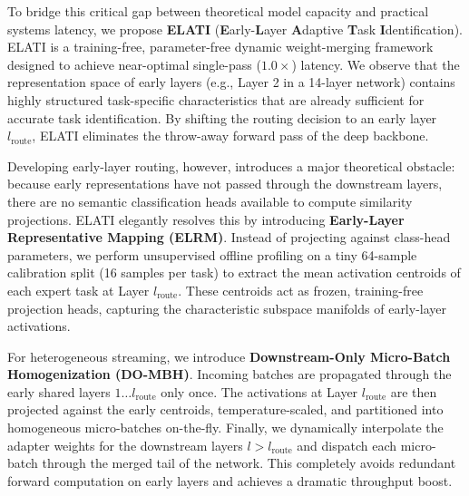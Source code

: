 To bridge this critical gap between theoretical model capacity and practical systems latency, we propose \textbf{ELATI} (\textbf{E}arly-\textbf{L}ayer \textbf{A}daptive \textbf{T}ask \textbf{I}dentification).
ELATI is a training-free, parameter-free dynamic weight-merging framework designed to achieve near-optimal single-pass ($1.0\times$) latency.
We observe that the representation space of early layers (e.g., Layer 2 in a 14-layer network) contains highly structured task-specific characteristics that are already sufficient for accurate task identification.
By shifting the routing decision to an early layer $l_{\text{route}}$, ELATI eliminates the throw-away forward pass of the deep backbone.

Developing early-layer routing, however, introduces a major theoretical obstacle: because early representations have not passed through the downstream layers, there are no semantic classification heads available to compute similarity projections.
ELATI elegantly resolves this by introducing \textbf{Early-Layer Representative Mapping (ELRM)}.
Instead of projecting against class-head parameters, we perform unsupervised offline profiling on a tiny 64-sample calibration split (16 samples per task) to extract the mean activation centroids of each expert task at Layer $l_{\text{route}}$.
These centroids act as frozen, training-free projection heads, capturing the characteristic subspace manifolds of early-layer activations.

For heterogeneous streaming, we introduce \textbf{Downstream-Only Micro-Batch Homogenization (DO-MBH)}.
Incoming batches are propagated through the early shared layers $1 \dots l_{\text{route}}$ only once.
The activations at Layer $l_{\text{route}}$ are then projected against the early centroids, temperature-scaled, and partitioned into homogeneous micro-batches on-the-fly.
Finally, we dynamically interpolate the adapter weights for the downstream layers $l > l_{\text{route}}$ and dispatch each micro-batch through the merged tail of the network.
This completely avoids redundant forward computation on early layers and achieves a dramatic throughput boost.

